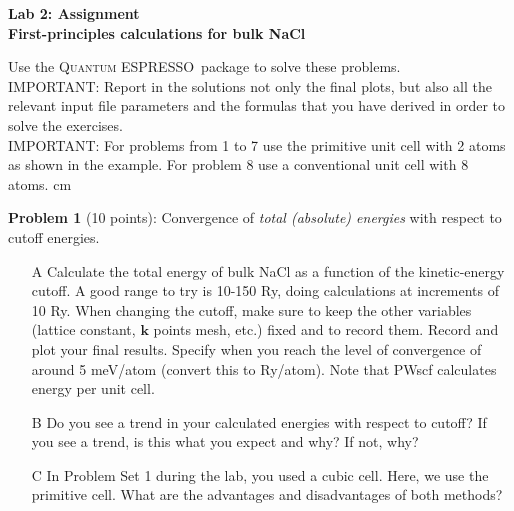 \documentclass[12pt]{article}
\def\QE{\textsc{Quantum ESPRESSO}}
\begin{document}
  $ $
  \vspace{5mm}

  \begin{center}

  { \bf \Large Lab 2: Assignment\\ First-principles calculations for bulk NaCl} \\

  \end{center}
  \vspace{5mm}

  Use the \QE\, package to solve these problems.\\ 

  IMPORTANT: Report in the solutions not only the final plots, but also all the relevant input file parameters and the formulas that you have derived in order to solve the exercises.\\

  IMPORTANT: For problems from 1 to 7 use the primitive unit cell with 2 atoms as shown in the example. For problem 8 use a conventional unit cell with 8 atoms.  
   cm

  \noindent
  {\bf Problem 1} (10 points):
  Convergence of {\em total (absolute) energies} with respect to cutoff energies.

  \begin{itemize}

    \item[A]
    Calculate the total energy of bulk NaCl as a function of the kinetic-energy cutoff.
    A good range to try is 10-150 Ry, doing calculations at increments of 10 Ry.
    When changing the cutoff, make sure to keep the other variables (lattice constant, $\mathbf{k}$ points mesh, etc.) fixed and to record them.
    Record and plot your final results.
    Specify when you reach the level of convergence of around 5 meV/atom (convert
    this to Ry/atom). Note that PWscf calculates energy per unit cell.

    \item[B]
    Do you see a trend in your calculated energies with respect to cutoff?
    If you see a trend, is this what you expect and why?
    If not, why?

    \item[C]
    In Problem Set 1 during the lab, you used a cubic cell. Here, we use the primitive cell.
    What are the advantages and disadvantages of both methods?

  \end{itemize}
  \vspace{6mm}
\end{document}
